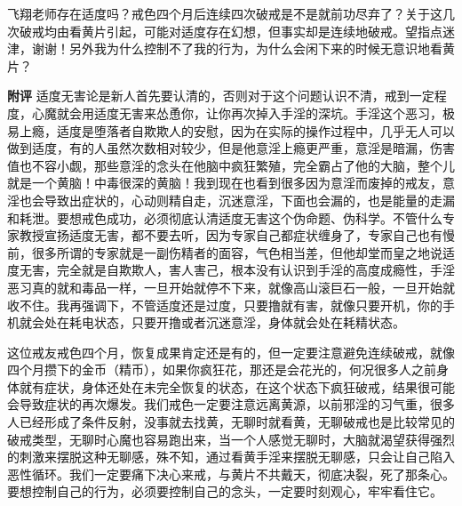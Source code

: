 \begin{case}
    飞翔老师存在适度吗？戒色四个月后连续四次破戒是不是就前功尽弃了？关于这几次破戒均由看黄片引起，可能对适度存在幻想，但事实却是连续地破戒。望指点迷津，谢谢！另外我为什么控制不了我的行为，为什么会闲下来的时候无意识地看黄片？

    \textbf{附评} 适度无害论是新人首先要认清的，否则对于这个问题认识不清，戒到一定程度，心魔就会用适度无害来怂恿你，让你再次掉入手淫的深坑。手淫这个恶习，极易上瘾，适度是堕落者自欺欺人的安慰，因为在实际的操作过程中，几乎无人可以做到适度，有的人虽然次数相对较少，但是他意淫上瘾更严重，意淫是暗漏，伤害值也不容小觑，那些意淫的念头在他脑中疯狂繁殖，完全霸占了他的大脑，整个儿就是一个黄脑！中毒很深的黄脑！我到现在也看到很多因为意淫而废掉的戒友，意淫也会导致出症状的，心动则精自走，沉迷意淫，下面也会漏的，也是能量的走漏和耗泄。要想戒色成功，必须彻底认清适度无害这个伪命题、伪科学。不管什么专家教授宣扬适度无害，都不要去听，因为专家自己都症状缠身了，专家自己也有慢前，很多所谓的专家就是一副伤精者的面容，气色相当差，但他却堂而皇之地说适度无害，完全就是自欺欺人，害人害己，根本没有认识到手淫的高度成瘾性，手淫恶习真的就和毒品一样，一旦开始就停不下来，就像高山滚巨石一般，一旦开始就收不住。我再强调下，不管适度还是过度，只要撸就有害，就像只要开机，你的手机就会处在耗电状态，只要开撸或者沉迷意淫，身体就会处在耗精状态。

    这位戒友戒色四个月，恢复成果肯定还是有的，但一定要注意避免连续破戒，就像四个月攒下的金币（精币），如果你疯狂花，那还是会花光的，何况很多人之前身体就有症状，身体还处在未完全恢复的状态，在这个状态下疯狂破戒，结果很可能会导致症状的再次爆发。我们戒色一定要注意远离黄源，以前邪淫的习气重，很多人已经形成了条件反射，没事就去找黄，无聊时就看黄，无聊破戒也是比较常见的破戒类型，无聊时心魔也容易跑出来，当一个人感觉无聊时，大脑就渴望获得强烈的刺激来摆脱这种无聊感，殊不知，通过看黄手淫来摆脱无聊感，只会让自己陷入恶性循环。我们一定要痛下决心来戒，与黄片不共戴天，彻底决裂，死了那条心。要想控制自己的行为，必须要控制自己的念头，一定要时刻观心，牢牢看住它。
\end{case}


